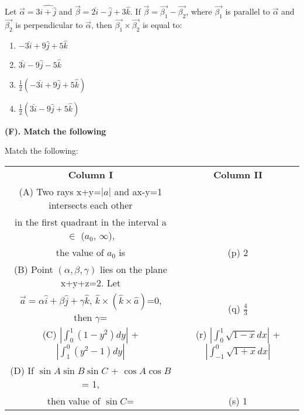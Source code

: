 \item Let $\overrightarrow{\alpha} = 3\hat{i + \hat{j}}$ and $\overrightarrow{\beta} = 2\hat{i} - \hat{j} + 3\hat{k}$. If $\overrightarrow{\beta} = \overrightarrow{\beta_1} - \overrightarrow{\beta_2}$, where $\overrightarrow{\beta_1}$ is parallel to $\overrightarrow{\alpha}$ and $\overrightarrow{\beta_2}$ is perpendicular to $\overrightarrow{\alpha}$, then $\overrightarrow{\beta_1} \times \overrightarrow{\beta_2}$ is equal to:
\begin{enumerate}
\item $-3\hat{i} + 9\hat{j} + 5\hat{k}$
\item $3\hat{i} - 9\hat{j} - 5\hat{k}$
\item $\frac{1}{2}(-3\hat{i} + 9\hat{j} + 5\hat{k})$
\item $\frac{1}{2}(3\hat{i} - 9\hat{j} + 5\hat{k})$
\end{enumerate}

\clearpage
\textbf{(F). Match the following}

\item Match the following:
\begin{table}[ht!]
\centering
\begin{tabular}{c c} 
 \textbf{Column I} & \textbf{Column II}\\ [0.5ex] 
 (A) Two rays x+y=$|a|$ and ax-y=1
  intersects each other\\ in the first
  quadrant in the interval a 
  $\in$ ($a_0$, $\infty$), \\
  the value of $a_0$ is                                               &(p) 2\\ 
 (B) Point $(\alpha,\beta,\gamma)$ lies on the plane x+y+z=2. 
 Let\\ $\overrightarrow{a}=\alpha\hat{i}+\beta\hat{j}+\gamma\hat{k}$, 
 $\hat{k} \times (\hat{k} \times \hat{a})$=0, then $\gamma$=          &(q) $\frac{4}{3}$\\
 (C) $|\int_{0}^{1}(1-y^{2})dy|$ 
 + $|\int_{1}^{0}(y^{2}-1)dy|$                                        &(r) $|\int_{0}^{1}\sqrt{1-x}dx|$
                                                                           +$|\int_{-1}^{0}\sqrt{1+x}dx|$\\
 (D) If $\sin A \sin B \sin C$ + $\cos A \cos B$ = 1,\\ 
 then value of $\sin C$=                                              &(s) 1\\[1ex] 
\end{tabular}
\end{table}\\

